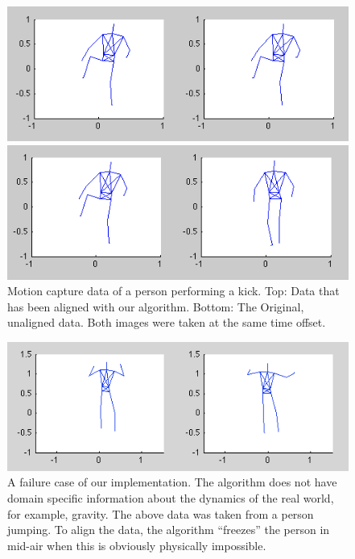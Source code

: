 \documentclass{article}
\begin{document}
\begin{figure}
\begin{centering}
\includegraphics[width=\columnwidth]{figures/kick_aligned.png}

\vspace{0.1in}

\includegraphics[width=\columnwidth]{figures/kick_unaligned.png}

\caption{Motion capture data of a person performing a kick. Top: Data that has
been aligned with our algorithm. Bottom: The Original, unaligned data. Both
images were taken at the same time offset. \label{figure:kick}}

\end{centering}
\end{figure}





\begin{figure}
\begin{centering}
\includegraphics[width=\columnwidth]{figures/jump.png}

\caption{A failure case of our implementation. The algorithm does not have
domain specific information about the dynamics of the real world, for example,
gravity. The above data was taken from a person jumping. To align the data,
the algorithm ``freezes'' the person in mid-air when this is obviously
physically impossible. \label{figure:jump}}

\end{centering}
\end{figure}
\end{document}
